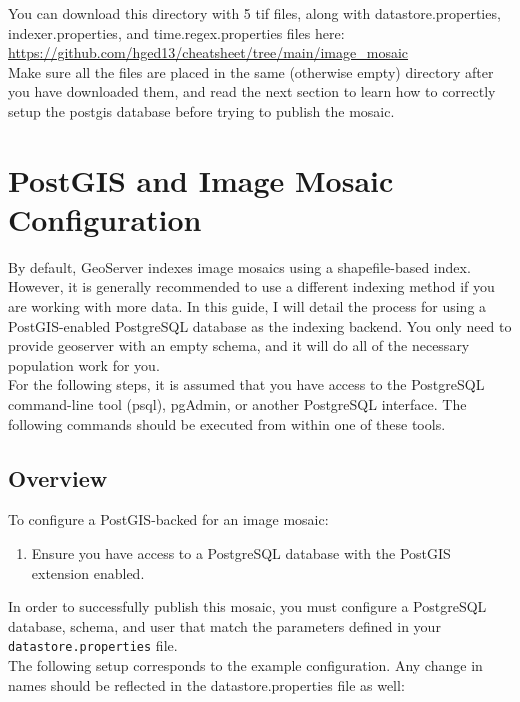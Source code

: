\documentclass{article}
\begin{document}
You can download this directory with 5 tif files, along with datastore.properties, indexer.properties, and time.regex.properties files here: \\
\url{https://github.com/hged13/cheatsheet/tree/main/image_mosaic} \\

Make sure all the files are placed in the same (otherwise empty) directory after you have downloaded them, and read the next section to learn how to correctly setup the postgis database before trying to publish the mosaic. 

\section{PostGIS and Image Mosaic Configuration}

By default, GeoServer indexes image mosaics using a shapefile-based index. However, it is generally recommended to use a different indexing method if you are working with more data. In this guide, I will detail the process for using a PostGIS-enabled PostgreSQL database as the indexing backend. You only need to provide geoserver with an empty schema, and it will do all of the necessary population work for you. \\


For the following steps, it is assumed that you have access to the PostgreSQL command-line tool (psql), pgAdmin, or another PostgreSQL interface. The following commands should be executed from within one of these tools.

\subsection*{Overview}

To configure a PostGIS-backed for an image mosaic:

\begin{enumerate}
  \item Ensure you have access to a PostgreSQL database with the PostGIS extension enabled.

\end{enumerate}

In order to successfully publish this mosaic, you must configure a PostgreSQL database, schema, and user that match the parameters defined in your \texttt{datastore.properties} file.  \\

The following setup corresponds to the example configuration. Any change in names should be reflected in the datastore.properties file as well:
\end{document}
